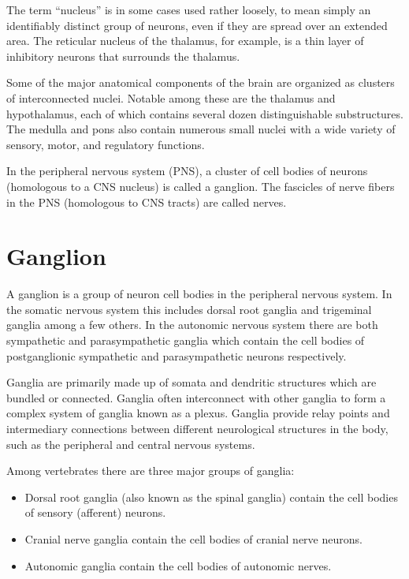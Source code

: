 \documentclass[]{book}
\providecommand{\tightlist}{%
  \setlength{\itemsep}{0pt}\setlength{\parskip}{0pt}}
\begin{document}
The term ``nucleus'' is in some cases used rather loosely, to mean simply an identifiably distinct group of neurons, even if they are spread over an extended area. The reticular nucleus of the thalamus, for example, is a thin layer of inhibitory neurons that surrounds the thalamus.

Some of the major anatomical components of the brain are organized as clusters of interconnected nuclei. Notable among these are the thalamus and hypothalamus, each of which contains several dozen distinguishable substructures. The medulla and pons also contain numerous small nuclei with a wide variety of sensory, motor, and regulatory functions.

In the peripheral nervous system (PNS), a cluster of cell bodies of neurons (homologous to a CNS nucleus) is called a ganglion. The fascicles of nerve fibers in the PNS (homologous to CNS tracts) are called nerves.

\hypertarget{ganglion}{%
\section{Ganglion}\label{ganglion}}

A ganglion is a group of neuron cell bodies in the peripheral nervous system. In the somatic nervous system this includes dorsal root ganglia and trigeminal ganglia among a few others. In the autonomic nervous system there are both sympathetic and parasympathetic ganglia which contain the cell bodies of postganglionic sympathetic and parasympathetic neurons respectively.

Ganglia are primarily made up of somata and dendritic structures which are bundled or connected. Ganglia often interconnect with other ganglia to form a complex system of ganglia known as a plexus. Ganglia provide relay points and intermediary connections between different neurological structures in the body, such as the peripheral and central nervous systems.

Among vertebrates there are three major groups of ganglia:

\begin{itemize}
\tightlist
\item
  Dorsal root ganglia (also known as the spinal ganglia) contain the cell bodies of sensory (afferent) neurons.
\item
  Cranial nerve ganglia contain the cell bodies of cranial nerve neurons.
\item
  Autonomic ganglia contain the cell bodies of autonomic nerves.
\end{itemize}
\end{document}
